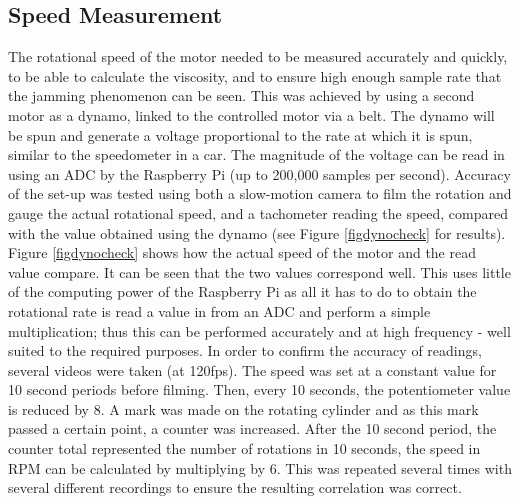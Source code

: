 \documentclass[twoside,a4]{report}
\def\br{\newline \newline \noindent}
\begin{document}
	\subsection*{Speed Measurement} %
	The rotational speed of the motor needed to be measured accurately and quickly, to be able to calculate the viscosity, and to ensure high enough sample rate that the jamming phenomenon can be seen. This was achieved by using a second motor as a dynamo, linked to the controlled motor via a belt. The dynamo will be spun and generate a voltage proportional to the rate at which it is spun, similar to the speedometer in a car. The magnitude of the voltage can be read in using an ADC by the Raspberry Pi (up to 200,000 samples per second). Accuracy of the set-up was tested using both a slow-motion camera to film the rotation and gauge the actual rotational speed, and a tachometer reading the speed, compared with the value obtained using the dynamo (see Figure \ref{figdynocheck} for results). \br
	Figure \ref{figdynocheck} shows how the actual speed of the motor and the read value compare. It can be seen that the two values correspond well. This uses little of the computing power of the Raspberry Pi as all it has to do to obtain the rotational rate is read a value in from an ADC and perform a simple multiplication; thus this can be performed accurately and at high frequency - well suited to the required purposes.\br
	In order to confirm the accuracy of readings, several videos were taken (at 120fps). The speed was set at a constant value for 10 second periods before filming. Then, every 10 seconds, the potentiometer value is reduced by 8. A mark was made on the rotating cylinder and as this mark passed a certain point, a counter was increased. After the 10 second period, the counter total represented the number of rotations in 10 seconds, the speed in RPM can be calculated by multiplying by 6. This was repeated several times with several different recordings to ensure the resulting correlation was correct.
	
\end{document}
